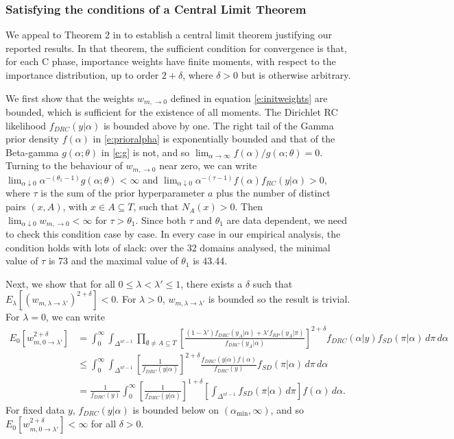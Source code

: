 \documentclass[11pt,letter]{article}
\begin{document}
\subsubsection{Satisfying the conditions of a Central Limit Theorem}

We appeal to Theorem 2 in  to establish a central limit theorem justifying our reported results.
In that theorem, the sufficient condition for convergence is that, for each C phase, importance weights have finite moments, with respect to the importance distribution, up to order $2+\delta$, where $\delta>0$ but is otherwise arbitrary.

We first show that the weights $w_{m,\to 0}$ defined in equation \eqref{e:initweights} are bounded, which is sufficient for the existence of all moments.
The Dirichlet RC likelihood $f_{DRC}(y|\alpha)$ is bounded above by one.
The right tail of the Gamma prior density $f(\alpha)$ in \eqref{e:prioralpha} is exponentially bounded and that of the Beta-gamma $g(\alpha;\theta)$ in \eqref{e:g} is not, and so $\lim_{\alpha \to \infty} f(\alpha)/g(\alpha; \theta) = 0$.
Turning to the behaviour of $w_{m,\to 0}$ near zero, we can write $\lim_{\alpha \downarrow 0} \alpha^{-(\theta_1 - 1)} g(\alpha;\theta) < \infty$ and $\lim_{\alpha \downarrow 0} \alpha^{-(\tau-1)} f(\alpha) f_{RC}(y|\alpha) > 0$, where $\tau$ is the sum of the prior hyperparameter $a$ plus the number of distinct pairs $(x,A)$, with $x \in A \subseteq T$, such that $N_A(x) > 0$.
Then $\lim_{\alpha \downarrow 0} w_{m,\to 0} < \infty$ for $\tau > \theta_1$.
Since both $\tau$ and $\theta_1$ are data dependent, we need to check this condition case by case.
In every case in our empirical analysis, the condition holds with lots of slack: over the 32 domains analysed, the minimal value of $\tau$ is 73 and the maximal value of $\theta_1$ is 43.44.

Next, we show that for all $0 \leq \lambda < \lambda' \leq 1$, there exists a $\delta$ such that $E_\lambda[(w_{m,\lambda \to \lambda'})^{2+\delta}] < 0$.
For $\lambda > 0$, $w_{m,\lambda \to \lambda'}$ is bounded so the result is trivial.
For $\lambda = 0$, we can write
\[
  \begin{aligned}
  E_0[w_{m,0 \to \lambda'}^{2+\delta}] &= \int_0^\infty \int_{\Delta^{n!-1}}
  \prod_{\emptyset \neq A \subseteq T}
  \left[
    \frac{(1-\lambda') f_{DRC}(y_A|\alpha) + \lambda'f_{RP}(y_A|\pi)}{f_{DRC}(y_A|\alpha)}
  \right]^{2+\delta}
  f_{DRC}(\alpha|y) f_{SD}(\pi|\alpha) \, d\pi \, d\alpha \\
  &\leq \int_0^\infty \int_{\Delta^{n!-1}}
  \left[
    \frac{1}{f_{DRC}(y|\alpha)}
  \right]^{2+\delta}
  \frac{f_{DRC}(y|\alpha) f(\alpha)}{f_{DRC}(y)} f_{SD}(\pi|\alpha) \, d\pi \, d\alpha \\
  &= \frac{1}{f_{DRC}(y)} \int_0^\infty
  \left[
    \frac{1}{f_{DRC}(y|\alpha)}
  \right]^{1+\delta}
  \left[
    \int_{\Delta^{n!-1}} f_{SD}(\pi|\alpha) \, d\pi
  \right]
  f(\alpha) \, d\alpha.
  \end{aligned}
\]
For fixed data $y$, $f_{DRC}(y|\alpha)$ is bounded below on $(\alpha_{\mathrm{min}},\infty)$, and so $E_0[w_{m,0\to\lambda'}^{2+\delta}] < \infty$ for all $\delta > 0$.
\end{document}
